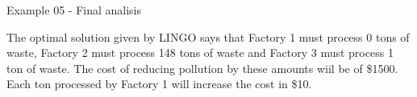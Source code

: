 \begin{frame}{Example 05 - Final analisis}


The optimal solution given by LINGO says that Factory 1 must process 0 tons of waste,
Factory 2 must process 148 tons of waste and Factory 3 must process 1 ton of waste.
The cost of reducing pollution by these amounts wiil be of \$1500. Each ton processed
by Factory 1 will increase the cost in \$10.
\end{frame}
